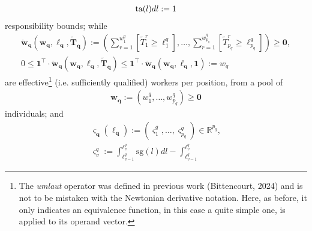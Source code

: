\documentclass[hidelinks, nonatbib]{elsarticle}
\begin{document}
\begin{axiom}
\begin{subaxiom}
\begin{gather}
{            \text{ta}(l)dl
        }
        :=
        1
    \end{gather}
    responsibility bounds; while
    \begin{gather}
        \boldsymbol{\ddot{w}_{q}}(
            \boldsymbol{w_{q}},
            \boldsymbol{\ell_{q}},
            \boldsymbol{\tilde{T}_{q}}
        )
        :=
        \left(
            \sum_{r=1}^{w_{1}^{q}}
            \left[
                \tilde{T}_{1}^{r}
                \geq
                \ell_{1}^{q}
            \right]
            ,
            \dots
            ,
            \sum_{r=1}^{w_{p_q}^{q}}
            \left[
                \tilde{T}_{p_q}^{r}
                \geq
                \ell_{p_q}^{q}
            \right]
        \right)
        \geq
        \boldsymbol{0}
        ,
        \\
        0
        \leq
        \boldsymbol{1} ^ {\top}
        \cdot
        \boldsymbol{\ddot{w}_{q}}(
            \boldsymbol{w_{q}},
            \boldsymbol{\ell_{q}},
            \boldsymbol{\tilde{T}_{q}}
        )
        \leq
        \boldsymbol{1} ^ {\top}
        \cdot
        \boldsymbol{\ddot{w}_{q}}(
            \boldsymbol{w_{q}},
            \boldsymbol{\ell_{q}},
            \boldsymbol{1}
        )
        :=
        w_q
    \end{gather}
    are effective\footnote{
        The \textit{umlaut} operator was defined in previous work (Bittencourt, 2024) and is not to be mistaken with the Newtonian derivative notation. Here, as before, it only indicates an equivalence function, in this case a quite simple one, is applied to its operand vector.
    } (i.e. sufficiently qualified) workers per position, from a pool of
    \begin{gather}
        \boldsymbol{w_{q}} := 
        (
            w_{1}^{q}
            ,
            \dots
            ,
            w_{p_q}^{q}
        )
        \geq
        \boldsymbol{0}
    \end{gather}
    individuals; and
    \begin{gather}
        \boldsymbol{\varsigma_{q}}(
            \boldsymbol{\ell_{q}}
        )
        :=
        \left(
            \varsigma_{1}^{q}
            ,
            \dots
            ,
            \varsigma_{p_q}^{q}
        \right)
        \in
        \mathbb{R} ^ {p_q}
        ,
        \\
        \varsigma_{v}^{q}
        :=
        \int_{\ell_{v-1}^{q}}^{\ell_{v}^{q}}
        \text{sg}(l)dl
        -
        \int_{\ell_{v-1}^{q}}^{\ell_{v}^{q}}

\end{gather}
\end{subaxiom}
\end{axiom}
\end{document}
